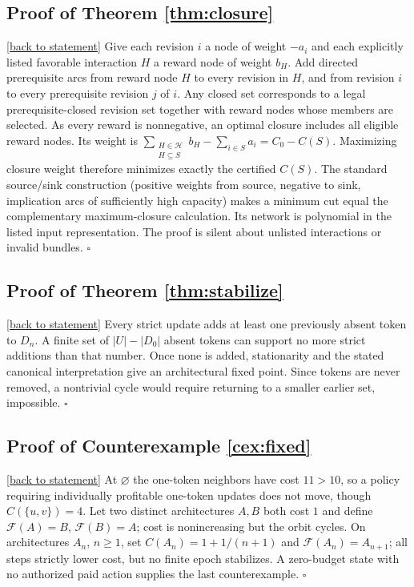 \documentclass[11pt,letterpaper]{article}
\theoremstyle{definition}
\theoremstyle{remark}
\newcommand{\F}{\mathcal F}
\newcommand{\backlink}[1]{\hyperlink{claim:#1}{\footnotesize[back to statement]}}
\begin{document}
\hypertarget{proof:closure}{}\subsection*{Proof of Theorem \ref{thm:closure}}\backlink{closure}
Give each revision $i$ a node of weight $-a_i$ and each explicitly listed favorable interaction $H$ a reward node of weight $b_H$. Add directed prerequisite arcs from reward node $H$ to every revision in $H$, and from revision $i$ to every prerequisite revision $j$ of $i$. Any closed set corresponds to a legal prerequisite-closed revision set together with reward nodes whose members are selected. As every reward is nonnegative, an optimal closure includes all eligible reward nodes. Its weight is $\sum_{\substack{H\in\mathcal H\\H\subseteq S}}b_H-\sum_{i\in S}a_i=C_0-C(S)$. Maximizing closure weight therefore minimizes exactly the certified $C(S)$. The standard source/sink construction (positive weights from source, negative to sink, implication arcs of sufficiently high capacity) makes a minimum cut equal the complementary maximum-closure calculation. Its network is polynomial in the listed input representation. The proof is silent about unlisted interactions or invalid bundles. $\square$

\hypertarget{proof:stabilize}{}\subsection*{Proof of Theorem \ref{thm:stabilize}}\backlink{stabilize}
Every strict update adds at least one previously absent token to $D_n$. A finite set of $|U|-|D_0|$ absent tokens can support no more strict additions than that number. Once none is added, stationarity and the stated canonical interpretation give an architectural fixed point. Since tokens are never removed, a nontrivial cycle would require returning to a smaller earlier set, impossible. $\square$

\hypertarget{proof:fixed}{}\subsection*{Proof of Counterexample \ref{cex:fixed}}\backlink{fixed}
At $\varnothing$ the one-token neighbors have cost $11>10$, so a policy requiring individually profitable one-token updates does not move, though $C(\{u,v\})=4$. Let two distinct architectures $A,B$ both cost $1$ and define $\F(A)=B$, $\F(B)=A$; cost is nonincreasing but the orbit cycles. On architectures $A_n$, $n\geq1$, set $C(A_n)=1+1/(n+1)$ and $\F(A_n)=A_{n+1}$; all steps strictly lower cost, but no finite epoch stabilizes. A zero-budget state with no authorized paid action supplies the last counterexample. $\square$
\end{document}
